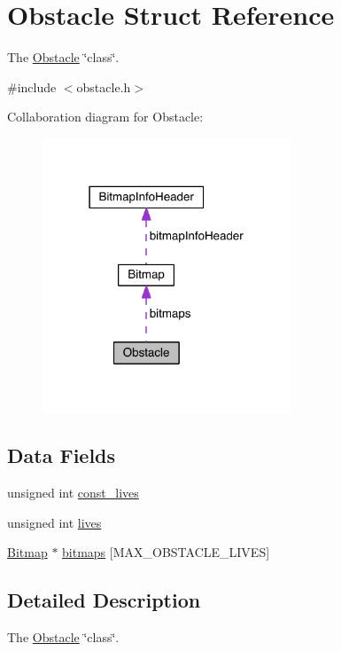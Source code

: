 \hypertarget{struct_obstacle}{}\section{Obstacle Struct Reference}
\label{struct_obstacle}


The \hyperlink{struct_obstacle}{Obstacle} \char`\"{}class\char`\"{}.  




{\ttfamily \#include $<$obstacle.\+h$>$}



Collaboration diagram for Obstacle\+:
\nopagebreak
\begin{figure}[H]
\begin{center}
\leavevmode
\includegraphics[width=210pt]{struct_obstacle__coll__graph}
\end{center}
\end{figure}
\subsection*{Data Fields}
\begin{DoxyCompactItemize}
\item 
unsigned int \hyperlink{struct_obstacle_ab9d581d927d2e11f929ee02052f9eb58}{const\+\_\+lives}
\item 
unsigned int \hyperlink{struct_obstacle_a5b6f67c2402ab532f12e2422ddd2f5e4}{lives}
\item 
\hyperlink{struct_bitmap}{Bitmap} $\ast$ \hyperlink{struct_obstacle_ad89799fda86133fec366bb53373d93b8}{bitmaps} \mbox{[}M\+A\+X\+\_\+\+O\+B\+S\+T\+A\+C\+L\+E\+\_\+\+L\+I\+V\+ES\mbox{]}
\end{DoxyCompactItemize}


\subsection{Detailed Description}
The \hyperlink{struct_obstacle}{Obstacle} \char`\"{}class\char`\"{}. 


